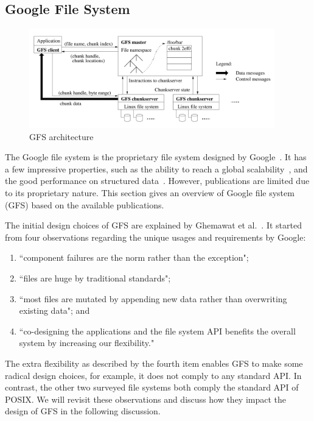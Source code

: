 \subsection{Google File System}
\label{sec:archi_google}
%
\begin{figure}
\centering
\includegraphics[width=0.95\textwidth]{image/gfs_architecture.png}
\caption{GFS architecture}
\label{fig:gfs_architecture}
\end{figure}
%
The Google file system is the proprietary file system designed by 
Google~\cite{ghemawat2003google}.
%
It has a few impressive properties, such as the ability to reach a global
scalability~\cite{Ford2010a,Corbett2012a}, and the good performance on 
structured data~\cite{Chang2006a}.
%
However, publications are limited due to its proprietary nature. 
%
This section gives an overview of Google file system (GFS) based on the available
publications.

The initial design choices of GFS are explained by 
Ghemawat et al.~\cite{ghemawat2003google}.
%
It started from four observations regarding the unique usages and 
requirements by Google:
%
\begin{enumerate}
\item ``component failures are the norm rather than the exception";
\item ``files are huge by traditional standards";
\item ``most files are mutated by appending new data
		rather than overwriting existing data"; and
\item ``co-designing the applications and the file system API benefits the 
		overall system by increasing our flexibility."
\end{enumerate}
%
The extra flexibility as described by the fourth item enables GFS to 
make some radical design choices, for example, it does not comply to
any standard API.
%
In contrast, the other two surveyed file systems both comply the 
standard API of POSIX.
%
We will revisit these observations and discuss how they
impact the design of GFS in the following discussion.


